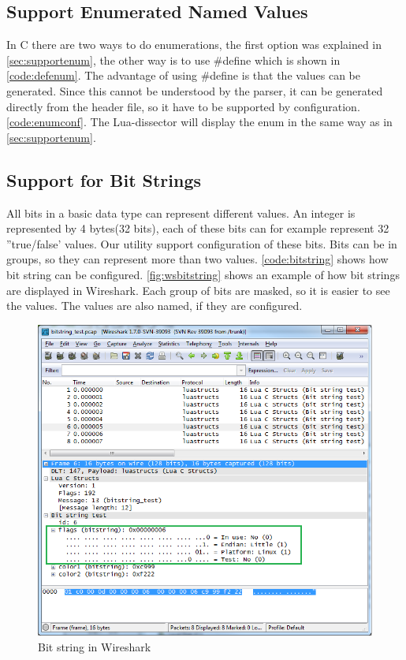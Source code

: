 \subsection{Support Enumerated Named Values}
In C there are two ways to do enumerations, the first option was explained in 
\autoref{sec:supportenum}, the other way is to use \#define which is shown in 
\autoref{code:defenum}. The advantage of using \#define is that the values 
can be generated. Since this cannot be understood by the parser, it can be 
generated directly from the header file, so it have to be supported by 
configuration. \autoref{code:enumconf}. The Lua-dissector will display the 
enum in the same way as in \autoref{sec:supportenum}.





\subsection{Support for Bit Strings}
All bits in a basic data type can represent different values. An integer is 
represented by 4 bytes(32 bits), each of these bits can for example represent 
32 ''true/false' values. Our utility support configuration of these bits. Bits 
can be in groups, so they can represent more than two values. 
\autoref{code:bitstring} shows how bit string can be configured. 
\autoref{fig:wsbitstring} shows an example of how bit strings are displayed in 
Wireshark. Each group of bits are masked, so it is easier to see the values. 
The values are also named, if they are configured.

\begin{figure}[ht]
	\center
	\includegraphics[width=\textwidth]{./sprints/img/wireshark_bitstring}
	\caption{Bit string in Wireshark\label{fig:wsbitstring}}
\end{figure}

